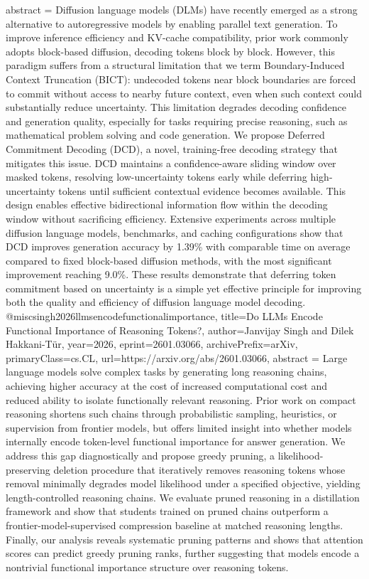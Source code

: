 {      abstract = {Diffusion language models (DLMs) have recently emerged as a strong alternative to autoregressive models by enabling parallel text generation. To improve inference efficiency and KV-cache compatibility, prior work commonly adopts block-based diffusion, decoding tokens block by block. However, this paradigm suffers from a structural limitation that we term Boundary-Induced Context Truncation (BICT): undecoded tokens near block boundaries are forced to commit without access to nearby future context, even when such context could substantially reduce uncertainty. This limitation degrades decoding confidence and generation quality, especially for tasks requiring precise reasoning, such as mathematical problem solving and code generation. We propose Deferred Commitment Decoding (DCD), a novel, training-free decoding strategy that mitigates this issue. DCD maintains a confidence-aware sliding window over masked tokens, resolving low-uncertainty tokens early while deferring high-uncertainty tokens until sufficient contextual evidence becomes available. This design enables effective bidirectional information flow within the decoding window without sacrificing efficiency. Extensive experiments across multiple diffusion language models, benchmarks, and caching configurations show that DCD improves generation accuracy by 1.39\% with comparable time on average compared to fixed block-based diffusion methods, with the most significant improvement reaching 9.0\%. These results demonstrate that deferring token commitment based on uncertainty is a simple yet effective principle for improving both the quality and efficiency of diffusion language model decoding.}
}@misc{singh2026llmsencodefunctionalimportance,
      title={Do LLMs Encode Functional Importance of Reasoning Tokens?}, 
      author={Janvijay Singh and Dilek Hakkani-Tür},
      year={2026},
      eprint={2601.03066},
      archivePrefix={arXiv},
      primaryClass={cs.CL},
      url={https://arxiv.org/abs/2601.03066},
      abstract = {Large language models solve complex tasks by generating long reasoning chains, achieving higher accuracy at the cost of increased computational cost and reduced ability to isolate functionally relevant reasoning. Prior work on compact reasoning shortens such chains through probabilistic sampling, heuristics, or supervision from frontier models, but offers limited insight into whether models internally encode token-level functional importance for answer generation. We address this gap diagnostically and propose greedy pruning, a likelihood-preserving deletion procedure that iteratively removes reasoning tokens whose removal minimally degrades model likelihood under a specified objective, yielding length-controlled reasoning chains. We evaluate pruned reasoning in a distillation framework and show that students trained on pruned chains outperform a frontier-model-supervised compression baseline at matched reasoning lengths. Finally, our analysis reveals systematic pruning patterns and shows that attention scores can predict greedy pruning ranks, further suggesting that models encode a nontrivial functional importance structure over reasoning tokens.}
}
